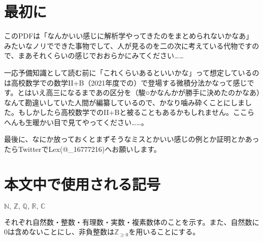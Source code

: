 \chapter{最初に}
このPDFは「なんかいい感じに解析学やってきたのをまとめられないかなあ」みたいなノリでできた事物でして、人が見るのを二の次に考えている代物ですので、まあそれくらいの感じでおおらかにみてください……

一応予備知識として読む前に「これくらいあるといいかな」って想定しているのは高校数学での数学II+B（2021年度での）で登場する微積分法かなって感じです。とはいえ高三になるまであの区分を（駿○かなんかが勝手に決めたのかなあ）なんて勘違いしていた人間が編纂しているので、かなり噛み砕くことにしました。もしかしたら高校数学でのII+Bと被ることもあるかもしれません。ここらへんも生暖かい目で見てやってください……。

最後に、なにか放っておくとまずそうなミスとかいい感じの例とか証明とかあったらTwitterでLex(@\_16777216)へお願いします。
\chapter{本文中で使用される記号}
$\mathbb{N},\,\mathbb{Z},\,\mathbb{Q},\,\mathbb{R},\,\mathbb{C}$

それぞれ自然数・整数・有理数・実数・複素数体のことを示す。また、自然数に0は含めないことにし、非負整数は$\mathbb{Z}_{\geq 0}$を用いることにする。
\clearpage
